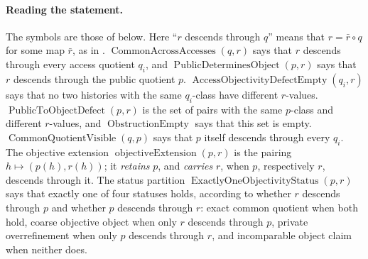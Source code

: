 \paragraph{Reading the statement.} The symbols are those of  below.
Here ``\(r\) descends through \(q\)'' means that \(r=\bar r\circ q\) for
some map \(\bar r\), as in .
\(\operatorname{CommonAcrossAccesses}(q,r)\) says that \(r\) descends
through every access quotient \(q_i\), and
\(\operatorname{PublicDeterminesObject}(p,r)\) says that \(r\) descends
through the public quotient \(p\).
\(\operatorname{AccessObjectivityDefectEmpty}(q_i,r)\) says that no two
histories with the same \(q_i\)-class have different \(r\)-values.
\(\operatorname{PublicToObjectDefect}(p,r)\) is the set of pairs with
the same \(p\)-class and different \(r\)-values, and
\(\operatorname{ObstructionEmpty}\) says that this set is empty.
\(\operatorname{CommonQuotientVisible}(q,p)\) says that \(p\) itself
descends through every \(q_i\). The objective extension
\(\operatorname{objectiveExtension}(p,r)\) is the pairing
\(h\mapsto(p(h),r(h))\); it \emph{retains} \(p\), and \emph{carries}
\(r\), when \(p\), respectively \(r\), descends through it.
The status partition
\(\operatorname{ExactlyOneObjectivityStatus}(p,r)\) says that exactly
one of four statuses holds, according to whether \(r\) descends through
\(p\) and whether \(p\) descends through \(r\): exact common quotient when
both hold, coarse objective object when only \(r\) descends through \(p\),
private overrefinement when only \(p\) descends through \(r\), and
incomparable object claim when neither does.

